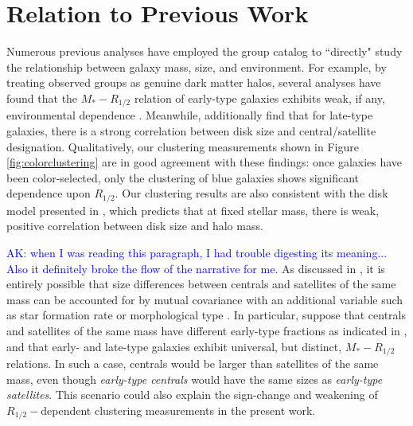 \documentclass[usenatbib,usegraphicx,letterpaper]{mn2e}
\newcommand{\rhalf}{R_{1/2}}
\newcommand{\mstar}{M_{\ast}}
\begin{document}
\section{Relation to Previous Work}
\label{sec:previous_work}

Numerous previous analyses have employed the \citet{yang_etal05b} group catalog to ``directly" study the relationship between galaxy mass, size, and environment. For example, by treating observed groups as genuine dark matter halos, several analyses have found that the $\mstar-\rhalf$ relation of early-type galaxies exhibits weak, if any, environmental dependence \citep{weinmann_etal08,huertas_company_etal13b,shankar_etal14}. Meanwhile, \citet{weinmann_etal08} additionally find that for late-type galaxies, there is a strong correlation between disk size and central/satellite designation. Qualitatively, our clustering measurements shown in Figure \ref{fig:colorclustering} are in good agreement with these findings: once galaxies have been color-selected, only the clustering of blue galaxies shows significant dependence upon $\rhalf.$ Our clustering results are also consistent with the disk model presented in \citet{dutton_etal08,dutton_etal10}, which predicts that at fixed stellar mass, there is weak, positive correlation between disk size and halo mass.

\textcolor{blue}{AK: when I was reading this paragraph, I had trouble digesting its meaning... Also it definitely broke the flow of the narrative for me.}
As discussed in \citet{spindler_wake17}, it is entirely possible that size differences between centrals and satellites of the same mass can be accounted for by mutual covariance with an additional variable such as star formation rate or morphological type \citep[see also][for an explicit demonstration of this scenario]{lilly_carollo16}. In particular, suppose that centrals and satellites of the same mass have different early-type fractions as indicated in \citet{weinmann_etal06}, and that early- and late-type galaxies exhibit universal, but distinct, $\mstar-\rhalf$ relations. In such a case, centrals would be larger than satellites of the same mass, even though {\em early-type centrals} would have the same sizes as {\em early-type satellites}. This scenario could also explain the sign-change and weakening of $\rhalf-$dependent clustering measurements in the present work.
\end{document}
